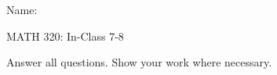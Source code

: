 \documentclass{article}
\begin{document}
\hspace{375pt}Name:

\begin{center}
{\Huge MATH 320: In-Class 7-8}

\end{center}

\bigskip\bigskip


Answer all questions. Show your work where necessary.\bigskip

\end{document}
